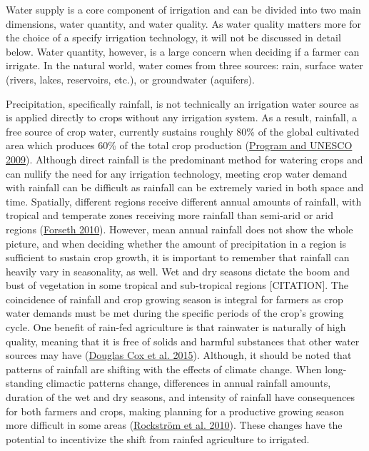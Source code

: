 \documentclass[12pt,twoside]{reedthesis}
\begin{document}
Water supply is a core component of irrigation and can be divided into two main dimensions, water quantity, and water quality. As water quality matters more for the choice of a specify irrigation technology, it will not be discussed in detail below. Water quantity, however, is a large concern when deciding if a farmer can irrigate. In the natural world, water comes from three sources: rain, surface water (rivers, lakes, reservoirs, etc.), or groundwater (aquifers).

Precipitation, specifically rainfall, is not technically an irrigation water source as is applied directly to crops without any irrigation system. As a result, rainfall, a free source of crop water, currently sustains roughly 80\% of the global cultivated area which produces 60\% of the total crop production (\protect\hyperlink{ref-worldwaterassesnentprogramUnitedNationsWorld2009}{Program and UNESCO 2009}). Although direct rainfall is the predominant method for watering crops and can nullify the need for any irrigation technology, meeting crop water demand with rainfall can be difficult as rainfall can be extremely varied in both space and time. Spatially, different regions receive different annual amounts of rainfall, with tropical and temperate zones receiving more rainfall than semi-arid or arid regions (\protect\hyperlink{ref-forsethTerrestrialBiomes2010}{Forseth 2010}). However, mean annual rainfall does not show the whole picture, and when deciding whether the amount of precipitation in a region is sufficient to sustain crop growth, it is important to remember that rainfall can heavily vary in seasonality, as well. Wet and dry seasons dictate the boom and bust of vegetation in some tropical and sub-tropical regions {[}CITATION{]}. The coincidence of rainfall and crop growing season is integral for farmers as crop water demands must be met during the specific periods of the crop's growing cycle. One benefit of rain-fed agriculture is that rainwater is naturally of high quality, meaning that it is free of solids and harmful substances that other water sources may have (\protect\hyperlink{ref-douglascox2015}{Douglas Cox et al. 2015}). Although, it should be noted that patterns of rainfall are shifting with the effects of climate change. When long-standing climactic patterns change, differences in annual rainfall amounts, duration of the wet and dry seasons, and intensity of rainfall have consequences for both farmers and crops, making planning for a productive growing season more difficult in some areas (\protect\hyperlink{ref-rockstromManagingWaterRainfed2010}{Rockström et al. 2010}). These changes have the potential to incentivize the shift from rainfed agriculture to irrigated.
\end{document}

